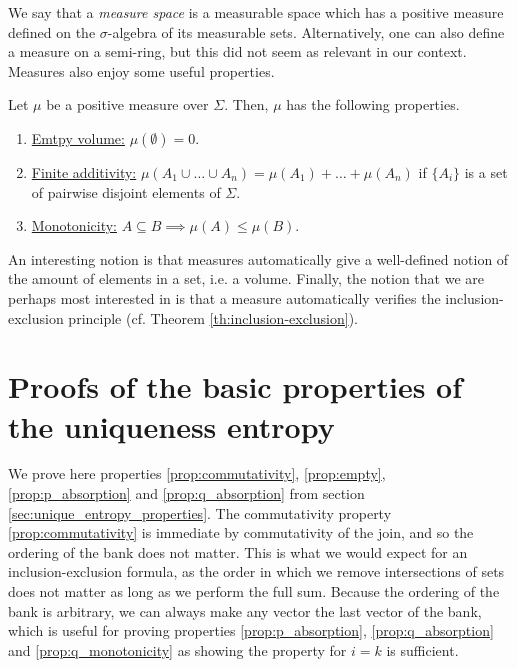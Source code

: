 We say that a \textit{measure space} is a measurable space which has a positive measure defined on the $\sigma$-algebra of its measurable sets. Alternatively, one can also define a measure on a semi-ring, but this did not seem as relevant in our context. Measures also enjoy some useful properties.

\begin{appendix_theorem}
    Let $\mu$ be a positive measure over $\Sigma$. Then, $\mu$ has the following properties.
    \begin{enumerate}
        \item \underline{Emtpy volume:} $\mu(\emptyset) = 0$.
        \item \underline{Finite additivity:} $\mu(A_1 \cup \dots \cup A_n) = \mu(A_1) + \dots + \mu(A_n)$ if $\{A_i\}$ is a set of pairwise disjoint elements of $\Sigma$.
        \item \underline{Monotonicity:} $A \subseteq B \implies \mu(A) \leq \mu(B)$.
    \end{enumerate}
\end{appendix_theorem}

An interesting notion is that measures automatically give a well-defined notion of the amount of elements in a set, i.e. a volume. Finally, the notion that we are perhaps most interested in is that a measure automatically verifies the inclusion-exclusion principle (cf. Theorem \ref{th:inclusion-exclusion}).



\newpage

\section{Proofs of the basic properties of the uniqueness entropy} \label{app:unique_entropy_properties}

\setcounter{equation}{0}

We prove here properties \ref{prop:commutativity}, \ref{prop:empty}, \ref{prop:p_absorption} and \ref{prop:q_absorption} from section \ref{sec:unique_entropy_properties}. The commutativity property \ref{prop:commutativity} is immediate by commutativity of the join, and so the ordering of the bank does not matter. This is what we would expect for an inclusion-exclusion formula, as the order in which we remove intersections of sets does not matter as long as we perform the full sum. Because the ordering of the bank is arbitrary, we can always make any vector the last vector of the bank, which is useful for proving properties \ref{prop:p_absorption}, \ref{prop:q_absorption} and \ref{prop:q_monotonicity} as showing the property for $i = k$ is sufficient.

